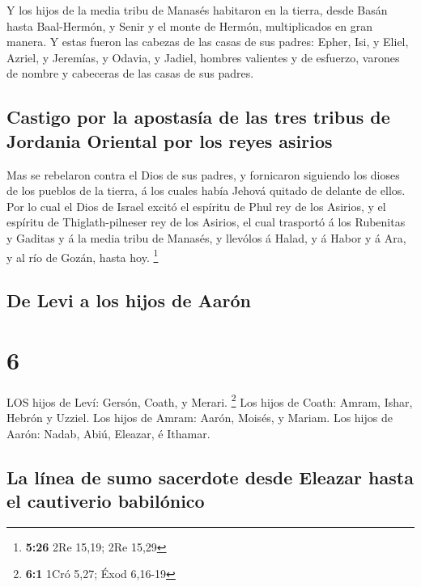  Y los hijos de la media tribu de Manasés habitaron en la
tierra, desde Basán hasta Baal-Hermón, y Senir y el monte de Hermón,
multiplicados en gran manera.  Y estas fueron las cabezas
de las casas de sus padres: Epher, Isi, y Eliel, Azriel, y Jeremías, y
Odavia, y Jadiel, hombres valientes y de esfuerzo, varones de nombre y
cabeceras de las casas de sus padres.

\hypertarget{castigo-por-la-apostasuxeda-de-las-tres-tribus-de-jordania-oriental-por-los-reyes-asirios}{%
\subsection{Castigo por la apostasía de las tres tribus de Jordania
Oriental por los reyes
asirios}\label{castigo-por-la-apostasuxeda-de-las-tres-tribus-de-jordania-oriental-por-los-reyes-asirios}}

 Mas se rebelaron contra el Dios de sus padres, y
fornicaron siguiendo los dioses de los pueblos de la tierra, á los
cuales había Jehová quitado de delante de ellos.  Por lo
cual el Dios de Israel excitó el espíritu de Phul rey de los Asirios, y
el espíritu de Thiglath-pilneser rey de los Asirios, el cual trasportó á
los Rubenitas y Gaditas y á la media tribu de Manasés, y llevólos á
Halad, y á Habor y á Ara, y al río de Gozán, hasta hoy. \footnote{\textbf{5:26}
  2Re 15,19; 2Re 15,29}

\hypertarget{de-levi-a-los-hijos-de-aaruxf3n}{%
\subsection{De Levi a los hijos de
Aarón}\label{de-levi-a-los-hijos-de-aaruxf3n}}

\hypertarget{section-5}{%
\section{6}\label{section-5}}

 LOS hijos de Leví: Gersón, Coath, y Merari. \footnote{\textbf{6:1}
  1Cró 5,27; Éxod 6,16-19}  Los hijos de Coath: Amram,
Ishar, Hebrón y Uzziel.  Los hijos de Amram: Aarón, Moisés,
y Mariam. Los hijos de Aarón: Nadab, Abiú, Eleazar, é Ithamar.

\hypertarget{la-luxednea-de-sumo-sacerdote-desde-eleazar-hasta-el-cautiverio-babiluxf3nico}{%
\subsection{La línea de sumo sacerdote desde Eleazar hasta el cautiverio
babilónico}\label{la-luxednea-de-sumo-sacerdote-desde-eleazar-hasta-el-cautiverio-babiluxf3nico}}

